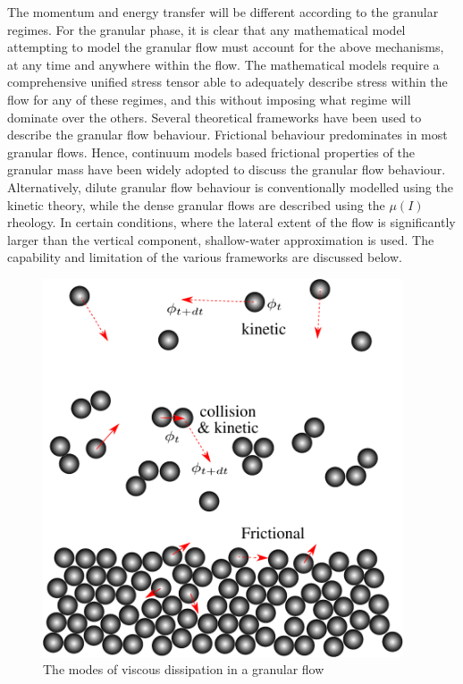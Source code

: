The momentum and energy transfer will be 
different according to the granular regimes. For the granular phase, it is 
clear that any mathematical model attempting to model the granular flow must 
account for the above mechanisms, at any time and anywhere within the flow. The 
mathematical models require a comprehensive unified stress tensor able to 
adequately describe stress within the flow for any of these regimes, and this 
without imposing what regime will dominate over the others. Several theoretical 
frameworks have been used to describe the granular flow behaviour. Frictional 
behaviour predominates in most granular flows. Hence, continuum models based 
frictional properties of the granular mass have been widely adopted to discuss 
the granular flow behaviour. Alternatively, dilute granular flow behaviour is 
conventionally modelled using the kinetic theory, while the dense granular 
flows are described using the $\mu(I)$ rheology. In certain conditions, where 
the lateral extent of the flow is significantly larger than the vertical 
component, shallow-water approximation is used. The capability and limitation 
of the various frameworks are discussed below. 
%
\begin{figure}[tbhp]
\centering
\includegraphics[width=0.95\textwidth]{kinetic}
\caption{The modes of viscous dissipation in a granular flow}
\label{fig:kinetic}
\end{figure}
%

